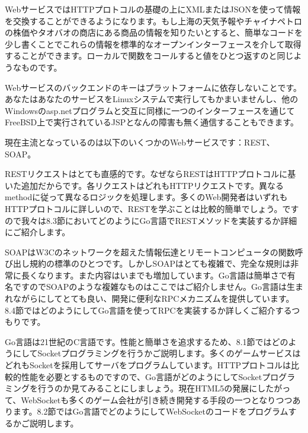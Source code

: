WebサービスではHTTPプロトコルの基礎の上にXMLまたはJSONを使って情報を交換することができるようになります。もし上海の天気予報やチャイナペトロの株価やタオバオの商店にある商品の情報を知りたいとすると、簡単なコードを少し書くことでこれらの情報を標準的なオープンインターフェースを介して取得することができます。ローカルで関数をコールすると値をひとつ返すのと同じようなものです。

Webサービスのバックエンドのキーはプラットフォームに依存しないことです。あなたはあなたのサービスをLinuxシステムで実行してもかまいませんし、他のWindowsのasp.netプログラムと交互に同様に一つのインターフェースを通じてFreeBSD上で実行されているJSPとなんの障害も無く通信することもできます。

現在主流となっているのは以下のいくつかのWebサービスです：REST、SOAP。

RESTリクエストはとても直感的です。なぜならRESTはHTTPプロトコルに基いた追加だからです。各リクエストはどれもHTTPリクエストです。異なるmethodに従って異なるロジックを処理します。多くのWeb開発者はいずれもHTTPプロトコルに詳しいので、RESTを学ぶことは比較的簡単でしょう。ですので我々は8.3節においてどのようにGo言語でRESTメソッドを実装するか詳細にご紹介します。

SOAPはW3Cのネットワークを超えた情報伝達とリモートコンピュータの関数呼び出し規約の標準のひとつです。しかしSOAPはとても複雑で、完全な規則は非常に長くなります。また内容はいまでも増加しています。Go言語は簡単さで有名ですのでSOAPのような複雑なものはここではご紹介しません。Go言語は生まれながらにしてとても良い、開発に便利なRPCメカニズムを提供しています。8.4節ではどのようにしてGo言語を使ってRPCを実装するか詳しくご紹介するつもりです。

Go言語は21世紀のC言語です。性能と簡単さを追求するため、8.1節ではどのようにしてSocketプログラミングを行うかご説明します。多くのゲームサービスはどれもSocketを採用してサーバをプログラムしています。HTTPプロトコルは比較的性能を必要とするものですので、Go言語がどのようにしてSocketプログラミングを行うのか見てみることにしましょう。現在HTML5の発展にしたがって、WebSocketも多くのゲーム会社が引き続き開発する手段の一つとなりつつあります。8.2節ではGo言語でどのようにしてWebSocketのコードをプログラムするかご説明します。
